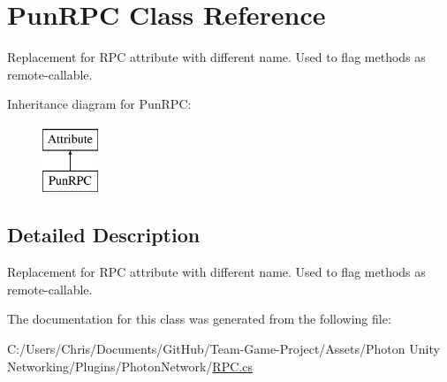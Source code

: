 \hypertarget{class_pun_r_p_c}{}\section{Pun\+R\+PC Class Reference}
\label{class_pun_r_p_c}


Replacement for R\+PC attribute with different name. Used to flag methods as remote-\/callable. 


Inheritance diagram for Pun\+R\+PC\+:\begin{figure}[H]
\begin{center}
\leavevmode
\includegraphics[height=2.000000cm]{class_pun_r_p_c}
\end{center}
\end{figure}


\subsection{Detailed Description}
Replacement for R\+PC attribute with different name. Used to flag methods as remote-\/callable.



The documentation for this class was generated from the following file\+:\begin{DoxyCompactItemize}
\item 
C\+:/\+Users/\+Chris/\+Documents/\+Git\+Hub/\+Team-\/\+Game-\/\+Project/\+Assets/\+Photon Unity Networking/\+Plugins/\+Photon\+Network/\hyperlink{_r_p_c_8cs}{R\+P\+C.\+cs}\end{DoxyCompactItemize}
